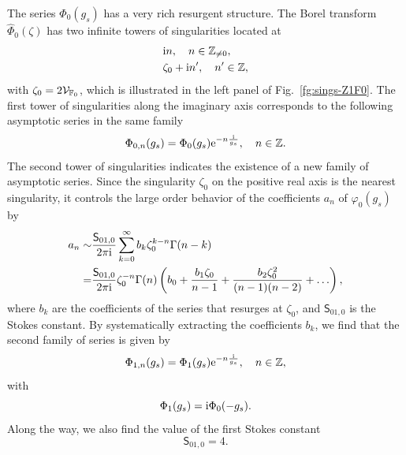 \documentclass[a4paper,11pt]{article}
\theoremstyle{definition}
\newcommand{\CV}{{\cal V}}
\def\IZ{{\mathbb Z}}
\def\IF{{\mathbb F}}
\newcommand{\re}{{\rm e}}
\newcommand{\ri}{{\rm i}}
\newcommand{\wh}[1]{\widehat{#1}}
\newcommand{\nn}{\nonumber \\}
\def\ms{\mathsf}
\begin{document}
The series $\Phi_{0}(g_s)$ has a very rich resurgent structure.  The
Borel transform $\wh{\Phi}_{0}(\zeta)$ has two infinite towers of
singularities located at
\begin{align}
  &\ri n ,\quad n \in\IZ_{\neq 0},\\
  &\zeta_0 + \ri n', \quad n'\in \IZ,
\end{align}
with $\zeta_0 = 2\CV_{\IF_0}$, which is illustrated in the left panel
of Fig.~\ref{fg:sings-Z1F0}.  The first tower of singularities along
the imaginary axis corresponds to the following asymptotic series in
the same family
\begin{equation}
  \Phi_{0,n}(g_s) = \Phi_{0}(g_s)\re^{-n\frac{\ri}{g_s}},\quad n\in
  \IZ.
  \label{eq:Phi0n-F0}
\end{equation}
The second tower of singularities indicates the existence of a new
family of asymptotic series.  Since the singularity $\zeta_0$ on the
positive real axis is the nearest singularity, it controls the large
order behavior of the coefficients $a_n$ of $\varphi_{0}(g_s)$ by
\begin{align}
  a_n \sim
  &\frac{\ms{S}_{01,0}}{2\pi\ri}
    \sum_{k=0}^\infty b_k\zeta_0^{k-n}\Gamma(n-k)
    \nn =
  &\frac{\ms{S}_{01,0}}{2\pi\ri} \zeta_{0}^{-n}\Gamma(n)
    \left(b_{0} + \frac{b_{1}\zeta_{0}}{n-1}
    + \frac{b_{2}\zeta_0^2}{(n-1)(n-2)}+\ldots\right),
    \label{eq:an-asym}
\end{align}
where $b_k$ are the coefficients of the series that resurges at
$\zeta_0$, and $\ms{S}_{01,0}$ is the Stokes constant.  By
systematically extracting the coefficients $b_k$, we find that the
second family of series is given by
%
\begin{equation}
  \Phi_{1,n}(g_s) = \Phi_{1}(g_s)\re^{-n\frac{\ri}{g_s}},\quad n\in\IZ,
  \label{eq:Phi1n-F0}
\end{equation}
%
with
%
\begin{equation}
  \Phi_{1}(g_s) = \ri \Phi_{0}(-g_s).\label{eq:Phi1F0}
\end{equation}
Along the way, we also find the value of the first Stokes constant
\begin{equation}
  \ms{S}_{01,0} = 4.  \label{eq:S0-F0}
\end{equation}
\end{document}
